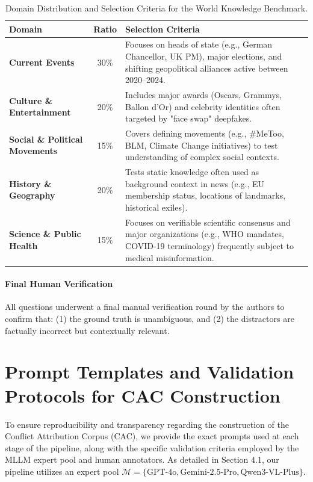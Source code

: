 \documentclass{article}
\theoremstyle{plain}
\theoremstyle{definition}
\theoremstyle{remark}
\begin{document}
\begin{table}[H]
\centering
\caption{Domain Distribution and Selection Criteria for the World Knowledge Benchmark.}
\label{tab:knowledge_domains}
\begin{tabular}{l|c|p{8cm}}
\toprule
\textbf{Domain} & \textbf{Ratio} & \textbf{Selection Criteria} \\
\midrule
\textbf{Current Events} & 30\% & Focuses on heads of state (e.g., German Chancellor, UK PM), major elections, and shifting geopolitical alliances active between 2020--2024. \\
\midrule
\textbf{Culture \& Entertainment} & 20\% & Includes major awards (Oscars, Grammys, Ballon d'Or) and celebrity identities often targeted by "face swap" deepfakes. \\
\midrule
\textbf{Social \& Political Movements} & 15\% & Covers defining movements (e.g., \#MeToo, BLM, Climate Change initiatives) to test understanding of complex social contexts. \\
\midrule
\textbf{History \& Geography} & 20\% & Tests static knowledge often used as background context in news (e.g., EU membership status, locations of landmarks, historical exiles). \\
\midrule
\textbf{Science \& Public Health} & 15\% & Focuses on verifiable scientific consensus and major organizations (e.g., WHO mandates, COVID-19 terminology) frequently subject to medical misinformation. \\
\bottomrule
\end{tabular}
\end{table}

\paragraph{Final Human Verification} All questions underwent a final manual verification round by the authors to confirm that: (1) the ground truth is unambiguous, and (2) the distractors are factually incorrect but contextually relevant.

\section{Prompt Templates and Validation Protocols for CAC Construction}
\label{sec:appendix_prompts}

To ensure reproducibility and transparency regarding the construction of the Conflict Attribution Corpus (CAC), we provide the exact prompts used at each stage of the pipeline, along with the specific validation criteria employed by the MLLM expert pool and human annotators. As detailed in Section 4.1, our pipeline utilizes an expert pool $\mathcal{M} = \{\text{GPT-4o}, \text{Gemini-2.5-Pro}, \text{Qwen3-VL-Plus}\}$.
\end{document}
